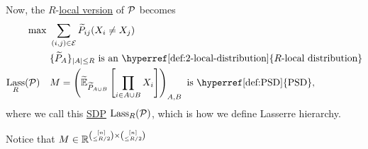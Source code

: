 Now, the \(R\)-\hyperref[def:local-distribution]{local version} of \(\mathcal{\MakeUppercase{p}} \) becomes
\[
	\begin{aligned}
		\max~                                                       & \sum_{(i, j)\in \mathcal{\MakeUppercase{e}} } \widetilde{P} _{ij} (X_i \neq X_j)                                                                                           \\
		                                                            & \{\widetilde{P} _A\}_{\left\vert A \right\vert \leq R} \text{ is an \hyperref[def:2-local-distribution]{\(R\)-local distribution}}                                         \\
		\mathop{\mathrm{Lass}}_R(\mathcal{\MakeUppercase{p}} )\quad & M = \left( \widetilde{\mathbb{\MakeUppercase{e}} }_{\widetilde{P} _{A \cup B}} \left[ \prod_{i\in A \cup B} X_i \right] \right) _{A, B}\text{ is \hyperref[def:PSD]{PSD}},
	\end{aligned}
\]
where we call this \hyperref[def:SDP]{SDP} \(\mathop{\mathrm{Lass}}_R(\mathcal{\MakeUppercase{p}} )\), which is how we define Lasserre hierarchy.

\begin{note}
	Notice that \(M\in \mathbb{\MakeUppercase{r}} ^{\binom{[n]}{\leq R / 2} \times \binom{[n]}{\leq R / 2}}\)
\end{note}